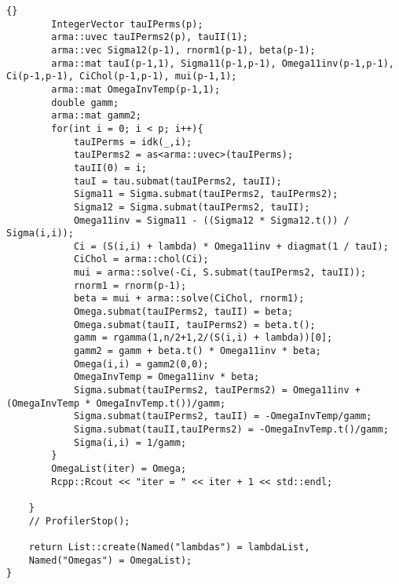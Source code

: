 \begin{lstlisting}{}
		IntegerVector tauIPerms(p);
		arma::uvec tauIPerms2(p), tauII(1);
		arma::vec Sigma12(p-1), rnorm1(p-1), beta(p-1);
		arma::mat tauI(p-1,1), Sigma11(p-1,p-1), Omega11inv(p-1,p-1), Ci(p-1,p-1), CiChol(p-1,p-1), mui(p-1,1);
		arma::mat OmegaInvTemp(p-1,1);
		double gamm;
		arma::mat gamm2;
		for(int i = 0; i < p; i++){
			tauIPerms = idk(_,i);
			tauIPerms2 = as<arma::uvec>(tauIPerms);
			tauII(0) = i;
			tauI = tau.submat(tauIPerms2, tauII);
			Sigma11 = Sigma.submat(tauIPerms2, tauIPerms2);
			Sigma12 = Sigma.submat(tauIPerms2, tauII);
			Omega11inv = Sigma11 - ((Sigma12 * Sigma12.t()) / Sigma(i,i));
			Ci = (S(i,i) + lambda) * Omega11inv + diagmat(1 / tauI);
			CiChol = arma::chol(Ci);
			mui = arma::solve(-Ci, S.submat(tauIPerms2, tauII));
			rnorm1 = rnorm(p-1);
			beta = mui + arma::solve(CiChol, rnorm1);
			Omega.submat(tauIPerms2, tauII) = beta;
			Omega.submat(tauII, tauIPerms2) = beta.t();
			gamm = rgamma(1,n/2+1,2/(S(i,i) + lambda))[0];
			gamm2 = gamm + beta.t() * Omega11inv * beta;
			Omega(i,i) = gamm2(0,0);
			OmegaInvTemp = Omega11inv * beta;
			Sigma.submat(tauIPerms2, tauIPerms2) = Omega11inv + (OmegaInvTemp * OmegaInvTemp.t())/gamm;
			Sigma.submat(tauIPerms2, tauII) = -OmegaInvTemp/gamm;
			Sigma.submat(tauII,tauIPerms2) = -OmegaInvTemp.t()/gamm;
			Sigma(i,i) = 1/gamm;
		}
		OmegaList(iter) = Omega;
		Rcpp::Rcout << "iter = " << iter + 1 << std::endl;
		
	}
	// ProfilerStop();
	
	return List::create(Named("lambdas") = lambdaList,
	Named("Omegas") = OmegaList);
}
\end{lstlisting}


